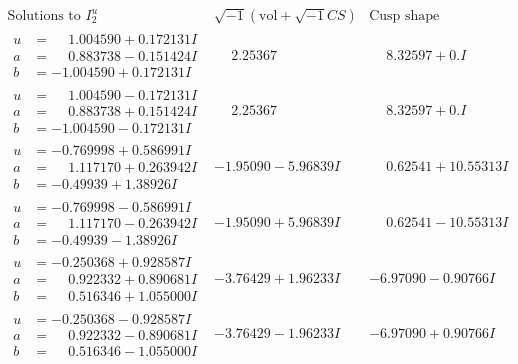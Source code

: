 \documentclass[1p]{elsarticle_modified}
\theoremstyle{definition}
\newcommand{\I}{\sqrt{-1}}
\begin{document}
$$\begin{array}{c|c|c}  
\text{Solutions to }I^u_{2}& \I (\text{vol} + \sqrt{-1}CS) & \text{Cusp shape}\\
 \hline 
\begin{aligned}
u &= \phantom{-}1.004590 + 0.172131 I \\
a &= \phantom{-}0.883738 - 0.151424 I \\
b &= -1.004590 + 0.172131 I\end{aligned}
 & \phantom{-}2.25367\phantom{ +0.000000I} & \phantom{-}8.32597 + 0. I\phantom{ +0.000000I} \\ \hline\begin{aligned}
u &= \phantom{-}1.004590 - 0.172131 I \\
a &= \phantom{-}0.883738 + 0.151424 I \\
b &= -1.004590 - 0.172131 I\end{aligned}
 & \phantom{-}2.25367\phantom{ +0.000000I} & \phantom{-}8.32597 + 0. I\phantom{ +0.000000I} \\ \hline\begin{aligned}
u &= -0.769998 + 0.586991 I \\
a &= \phantom{-}1.117170 + 0.263942 I \\
b &= -0.49939 + 1.38926 I\end{aligned}
 & -1.95090 - 5.96839 I & \phantom{-}0.62541 + 10.55313 I \\ \hline\begin{aligned}
u &= -0.769998 - 0.586991 I \\
a &= \phantom{-}1.117170 - 0.263942 I \\
b &= -0.49939 - 1.38926 I\end{aligned}
 & -1.95090 + 5.96839 I & \phantom{-}0.62541 - 10.55313 I \\ \hline\begin{aligned}
u &= -0.250368 + 0.928587 I \\
a &= \phantom{-}0.922332 + 0.890681 I \\
b &= \phantom{-}0.516346 + 1.055000 I\end{aligned}
 & -3.76429 + 1.96233 I & -6.97090 - 0.90766 I \\ \hline\begin{aligned}
u &= -0.250368 - 0.928587 I \\
a &= \phantom{-}0.922332 - 0.890681 I \\
b &= \phantom{-}0.516346 - 1.055000 I\end{aligned}
 & -3.76429 - 1.96233 I & -6.97090 + 0.90766 I \\ \hline\begin{aligned}

\end{aligned}
\end{array}$$
\end{document}
